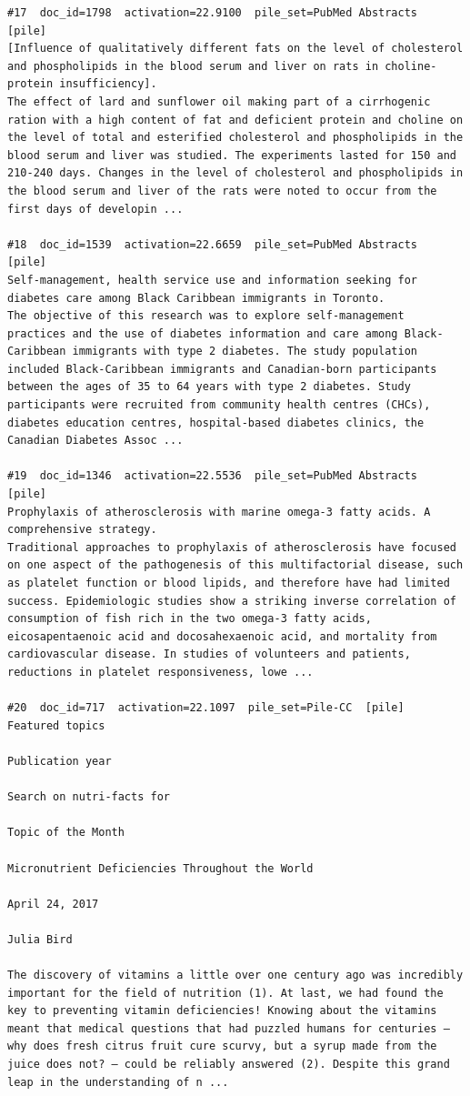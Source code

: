\begin{verbatim}
#17  doc_id=1798  activation=22.9100  pile_set=PubMed Abstracts  [pile]
[Influence of qualitatively different fats on the level of cholesterol and phospholipids in the blood serum and liver on rats in choline-protein insufficiency].
The effect of lard and sunflower oil making part of a cirrhogenic ration with a high content of fat and deficient protein and choline on the level of total and esterified cholesterol and phospholipids in the blood serum and liver was studied. The experiments lasted for 150 and 210-240 days. Changes in the level of cholesterol and phospholipids in the blood serum and liver of the rats were noted to occur from the first days of developin ...

#18  doc_id=1539  activation=22.6659  pile_set=PubMed Abstracts  [pile]
Self-management, health service use and information seeking for diabetes care among Black Caribbean immigrants in Toronto.
The objective of this research was to explore self-management practices and the use of diabetes information and care among Black-Caribbean immigrants with type 2 diabetes. The study population included Black-Caribbean immigrants and Canadian-born participants between the ages of 35 to 64 years with type 2 diabetes. Study participants were recruited from community health centres (CHCs), diabetes education centres, hospital-based diabetes clinics, the Canadian Diabetes Assoc ...

#19  doc_id=1346  activation=22.5536  pile_set=PubMed Abstracts  [pile]
Prophylaxis of atherosclerosis with marine omega-3 fatty acids. A comprehensive strategy.
Traditional approaches to prophylaxis of atherosclerosis have focused on one aspect of the pathogenesis of this multifactorial disease, such as platelet function or blood lipids, and therefore have had limited success. Epidemiologic studies show a striking inverse correlation of consumption of fish rich in the two omega-3 fatty acids, eicosapentaenoic acid and docosahexaenoic acid, and mortality from cardiovascular disease. In studies of volunteers and patients, reductions in platelet responsiveness, lowe ...

#20  doc_id=717  activation=22.1097  pile_set=Pile-CC  [pile]
Featured topics

Publication year

Search on nutri-facts for

Topic of the Month

Micronutrient Deficiencies Throughout the World

April 24, 2017

Julia Bird

The discovery of vitamins a little over one century ago was incredibly important for the field of nutrition (1). At last, we had found the key to preventing vitamin deficiencies! Knowing about the vitamins meant that medical questions that had puzzled humans for centuries – why does fresh citrus fruit cure scurvy, but a syrup made from the juice does not? – could be reliably answered (2). Despite this grand leap in the understanding of n ...

\end{verbatim}

